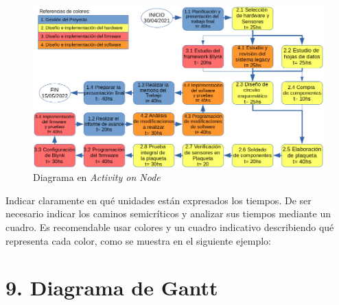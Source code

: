\documentclass[
11pt, %
]{charter}
\begin{document}
\begin{figure}[htpb]
\centering 
\includegraphics[width=.8\textwidth]{./Figuras/AoN.png}
\caption{Diagrama en \textit{Activity on Node}}
\label{fig:AoN}
\end{figure}

Indicar claramente en qué unidades están expresados los tiempos.
De ser necesario indicar los caminos semicríticos y analizar sus tiempos mediante un cuadro.
Es recomendable usar colores y un cuadro indicativo describiendo qué representa cada color, como se muestra en el siguiente ejemplo:



\section{9. Diagrama de Gantt}
\label{sec:gantt}
\end{document}
